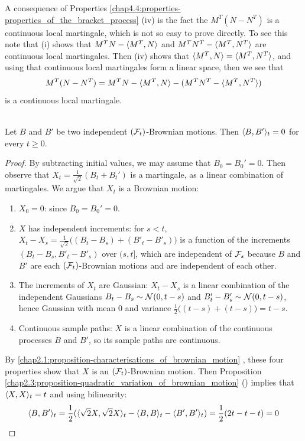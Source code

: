 \begin{remark}\label{chap4.5:remark-remark_on_consequence_of_properties_of_bracket_process}
A consequence of Properties \ref{chap4.4:properties-properties_of_the_bracket_process} (iv) is the fact the $M^T(N-N^T)$ is a continuous local martingale, which is not so easy to prove directly. To see this note that (i) shows that $M^TN-\langle M^T,N\rangle$ and $M^TN^T - \langle M^T,N^T\rangle$ are continuous local martingales. Then (iv) shows that $\langle M^T,N\rangle=\langle M^T,N^T\rangle$, and using that continuous local martingales form a linear space, then we see that
$$M^T(N-N^T)=M^TN-\langle M^T,N\rangle-(M^TN^T - \langle M^T,N^T\rangle)$$
is a continuous local martingale.
\end{remark}

\begin{proposition}\label{chap4.4:proposition-independence_of_brownian_motions_implies_zero_bracket_process}
 \\
Let $B$ and $B'$ be two independent $(\mathcal{F}_t)$-Brownian motions. Then $\langle B,B'\rangle_t=0$ for every $t \geq 0$. 
\end{proposition}
\begin{proof}
By subtracting initial values, we may assume that $B_0=B_0'=0$. Then observe that $X_t = \frac{1}{\sqrt{2}}(B_t+B_t')$ is a martingale, as a linear combination of martingales. We argue that $X_t$ is a Brownian motion:
\begin{enumerate}
    \item $X_0=0$: since $B_0=B_0'=0$.
    \item $X$ has independent increments: for $s<t$, $X_t-X_s=\tfrac{1}{\sqrt2}\big((B_t-B_s)+(B'_t-B'_s)\big)$ is a function of the increments $(B_t-B_s,B'_t-B'_s)$ over $(s,t]$, which are independent of $\mathcal{F}_s$ because $B$ and $B'$ are each $(\mathcal{F}_t)$-Brownian motions and are independent of each other.
    \item The increments of $X_t$ are Gaussian: $X_t-X_s$ is a linear combination of the independent Gaussians $B_t-B_s\sim\mathcal{N}(0,t-s)$ and $B'_t-B'_s\sim\mathcal{N}(0,t-s)$, hence Gaussian with mean $0$ and variance $\tfrac12\big((t-s)+(t-s)\big)=t-s$.
    \item Continuous sample paths: $X$ is a linear combination of the continuous processes $B$ and $B'$, so its sample paths are continuous.
\end{enumerate}
By \cref{chap2.1:proposition-characterisations_of_brownian_motion} , these four properties show that $X$ is an $(\mathcal{F}_t)$-Brownian motion. Then Proposition \ref{chap2.3:proposition-quadratic_variation_of_brownian_motion} ()
implies that $\langle X,X\rangle_t=t$ and using bilinearity:
$$\langle B,B'\rangle_t=\frac12(\langle \sqrt{2}X,\sqrt{2}X\rangle_t-\langle B,B\rangle_t-\langle B',B'\rangle_t)=\frac12(2t-t-t)=0$$
\end{proof}

